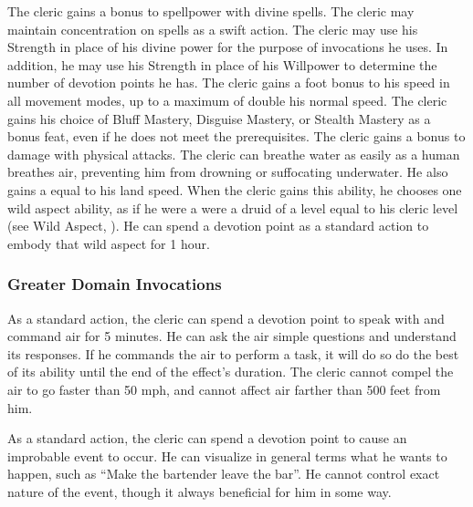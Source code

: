             The cleric gains a  bonus to spellpower with divine spells.
            The cleric may maintain concentration on  spells as a swift action.
            The cleric may use his Strength in place of his divine power for the purpose of invocations he uses.
            In addition, he may use his Strength in place of his Willpower to determine the number of devotion points he has.
            The cleric gains a  foot bonus to his speed in all movement modes, up to a maximum of double his normal speed.
            The cleric gains his choice of Bluff Mastery, Disguise Mastery, or Stealth Mastery as a bonus feat, even if he does not meet the prerequisites.
            The cleric gains a  bonus to damage with physical attacks.
             The cleric can breathe water as easily as a human breathes air, preventing him from drowning or suffocating underwater.
            He also gains a  equal to his land speed.
            When the cleric gains this ability, he chooses one wild aspect ability, as if he were a were a druid of a level equal to his cleric level (see Wild Aspect, ).
            He can spend a devotion point as a standard action to embody that wild aspect for 1 hour.

        \subsubsection{Greater Domain Invocations}\label{Greater Domain Invocations}

            As a standard action, the cleric can spend a devotion point to speak with and command air for 5 minutes.
            He can ask the air simple questions and understand its responses.
            If he commands the air to perform a task, it will do so do the best of its ability until the end of the effect's duration.
            The cleric cannot compel the air to go faster than 50 mph, and cannot affect air farther than 500 feet from him.

            As a standard action, the cleric can spend a devotion point to cause an improbable event to occur.
            He can visualize in general terms what he wants to happen, such as ``Make the bartender leave the bar''.
            He cannot control exact nature of the event, though it always beneficial for him in some way.

